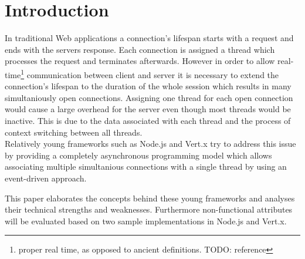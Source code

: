 

\title{\papertitle}
\author{Rocco Schulz, Max Vökler, Joe Boden,\\ Robert Wawrzyniak, Can Paul Bineytioglu\\\\
	Corporate State University\\Baden-Wuerttemberg - Stuttgart}

\date{\today}



\maketitle


\begin{abstract}
This paper evaluates asynchronous server technologies. Strenghts and weaknesses
of asynchronous programming models are elaborated and a proof of concept 
based on node.js and vert.x is used to evaluate non-functional attributes such as
maintainability. \ldots
\end{abstract}
\newpage

\tableofcontents
\newpage

\section{Introduction}
In traditional Web applications a connection's lifespan starts with a request and
ends with the servers response. Each connection is assigned a thread which
processes the request and terminates afterwards.
However in order to allow real-time\footnote{proper real time, as opposed to
ancient definitions. TODO: reference} communication between client and server it
is necessary to extend the connection's lifespan to the duration of the whole
session which results in many simultaniously open connections.
Assigning one thread for each open connection would cause a large overhead for
the server even though most threads would be inactive. This is due to the data
associated with each thread and the process of context switching between all
threads.\\
Relatively young frameworks such as Node.js and Vert.x try to address this issue 
by providing a completely asynchronous programming model which allows associating
multiple simultanious connections with a single thread by using an event-driven approach.

This paper elaborates the concepts behind these young frameworks and analyses their 
technical strengths and weaknesses. Furthermore non-functional attributes will be
evaluated based on two sample implementations in Node.js  and Vert.x.

